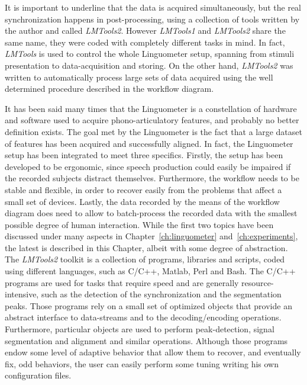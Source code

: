 It is important to underline that the data is acquired simultaneously, but the
real synchronization happens in post-processing, using a collection of tools
written by the author and called \emph{LMTools2}.
However \emph{LMTools1} and \emph{LMTools2} share the same name, they were coded
with completely different tasks in mind.
In fact, \emph{LMTools} is used to control the whole Linguometer setup, spanning
from stimuli presentation to data-acquisition and storing.
On the other hand, \emph{LMTools2} was written to automatically process large
sets of data acquired using the well determined procedure described in the
workflow diagram.

It has been said many times that the Linguometer is a constellation of hardware
and software used to acquire phono-articulatory features, and probably no better
definition exists.
The goal met by the Linguometer is the fact that a large dataset of features has
been acquired and successfully aligned.
In fact, the Linguometer setup has been integrated to meet three specifics.
Firstly, the setup has been developed to be ergonomic, since speech production
could easily be impaired if the recorded subjects distract themselves.
Furthermore, the workflow needs to be stable and flexible, in order to recover
easily from the problems that affect a small set of devices.
Lastly, the data recorded by the means of the workflow diagram does need to 
allow to batch-process the recorded data with the smallest possible degree of
human interaction.
While the first two topics have been discussed under many aspects in
Chapter~\ref{ch:linguometer} and~\ref{ch:experiments}, the latest is described
in this Chapter, albeit with some degree of abstraction.\\

The \emph{LMTools2} toolkit is a collection of programs, libraries and
scripts, coded using different languages, such as C/C++, Matlab, Perl and Bash.
The C/C++ programs are used for tasks that require speed and are generally
resource-intensive, such as the detection of the synchronization and the
segmentation peaks. 
Those programs rely on a small set of optimized objects that provide an
abstract interface to data-streams and to the decoding/encoding operations.
Furthermore, particular objects are used to perform peak-detection, signal
segmentation and alignment and similar operations.
Although those programs endow some level of adaptive behavior that allow them
to recover, and eventually fix, odd behaviors, the user can easily perform
some tuning writing his own configuration files.

